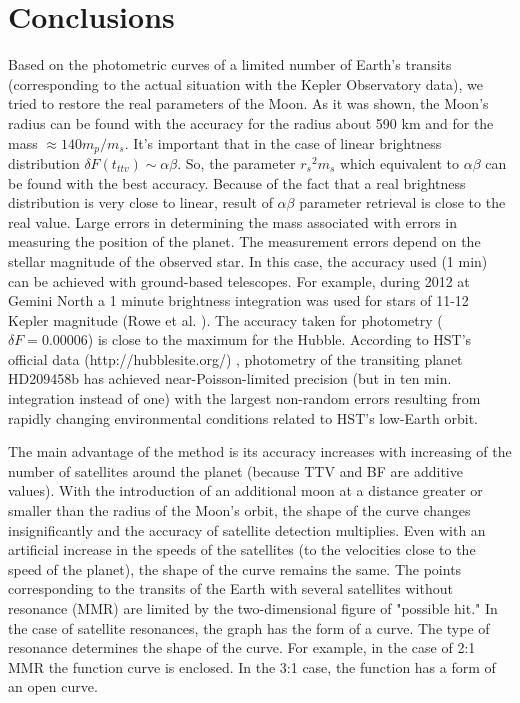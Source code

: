 \documentclass[12pt]{article}
\begin{document}
%

\section{Conclusions}

 Based on the photometric curves of a limited number of Earth's transits (corresponding to the actual situation with the Kepler Observatory data), we tried to restore the real parameters of the Moon. As it was shown, the Moon's radius can be found with the accuracy for the radius about 590 km and for the mass $\approx 140  m_p/m_s$. It's important that in the case of linear brightness distribution $\delta F(t_{ttv}) \sim \alpha \beta$. So, the parameter $ {r_s}^2 m_s$ which equivalent to $\alpha \beta$ can be found with the best accuracy. Because of the fact that a real brightness distribution is very close to linear, result of $\alpha \beta$ parameter retrieval is close to the real value.
 Large errors in determining the mass associated with errors in measuring the position of the planet. The measurement errors depend on the stellar magnitude of the observed star. In this case, the accuracy used (1 min) can be achieved with ground-based telescopes. For example, during 2012 at Gemini North a 1 minute brightness integration was used for stars of 11-12 Kepler magnitude  (Rowe et al. \cite{Rowe}). 
 The accuracy taken for photometry ($\delta F=0.00006$) is close to the maximum for the Hubble. According to HST's official data (http://hubblesite.org/) ,
  photometry of the transiting planet HD209458b has achieved near-Poisson-limited precision (but in ten min. integration instead of one) with the largest non-random errors resulting from rapidly changing environmental conditions related to HST's low-Earth orbit.

The main advantage of the method is its accuracy increases with increasing of the number of satellites around the planet (because TTV and BF are additive values).
With the introduction of an additional moon at a distance greater or smaller than the radius of the Moon's orbit, the shape of the curve changes insignificantly and the accuracy of satellite detection multiplies. Even with an artificial increase in the speeds of the satellites (to the velocities close to the speed of the planet), the shape of the curve remains the same.
The points corresponding to the transits of the Earth with several satellites without resonance (MMR) are limited by the two-dimensional figure of "possible hit." In the case of satellite resonances, the graph has the form of a curve. The type of resonance determines the shape of the curve. For example, in the case of 2:1 MMR the function curve is enclosed. In the 3:1 case, the function has a form of an open curve.
\end{document}
